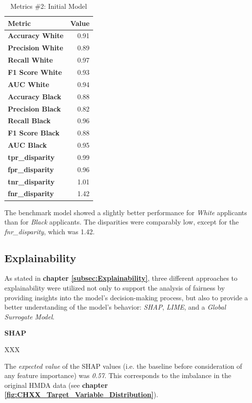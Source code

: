 \begin{table}[h]
    \centering
    \begin{tabular}{lr}
    \toprule
    \textbf{Metric} & \textbf{Value} \\
    \midrule
    \textbf{Accuracy White} & 0.91 \\
    \textbf{Precision White} & 0.89 \\
    \textbf{Recall White} & 0.97 \\
    \textbf{F1 Score White} & 0.93 \\
    \textbf{AUC White} & 0.94 \\
    \midrule
    \textbf{Accuracy Black} & 0.88 \\
    \textbf{Precision Black} & 0.82 \\
    \textbf{Recall Black} & 0.96 \\
    \textbf{F1 Score Black} & 0.88 \\
    \textbf{AUC Black} & 0.95 \\
    \midrule
    \textbf{tpr\_disparity} & 0.99 \\
    \textbf{fpr\_disparity} & 0.96 \\
    \textbf{tnr\_disparity} & 1.01 \\
    \textbf{fnr\_disparity} & 1.42 \\
    \bottomrule
    \end{tabular}
    \caption{Metrics \#2: Initial Model}
    \label{tab:Fairness_Assessment_Initial}
    \small
    The benchmark model showed a slightly better performance for \textit{White} applicants than for \textit{Black} applicants. The disparities were comparably low, except for the \textit{fnr\_disparity}, which was 1.42.
\end{table}

\subsection{Explainability}\label{Explainability Results}

As stated in \textbf{chapter \ref{subsec:Explainability}}, three different approaches to explainability were utilized not only to support the analysis of fairness by providing insights into the model's decision-making process, but also to provide a better understanding of the model's behavior: \textit{SHAP}, \textit{LIME}, and a \textit{Global Surrogate Model}. 

\textbf{SHAP}

XXX

The \textit{expected value} of the SHAP values (i.e. the baseline before consideration of any feature importance) was \textit{0.57}. This corresponds to the imbalance in the original HMDA data (see \textbf{chapter \ref{fig:CHXX_Target_Variable_Distribution}}).

